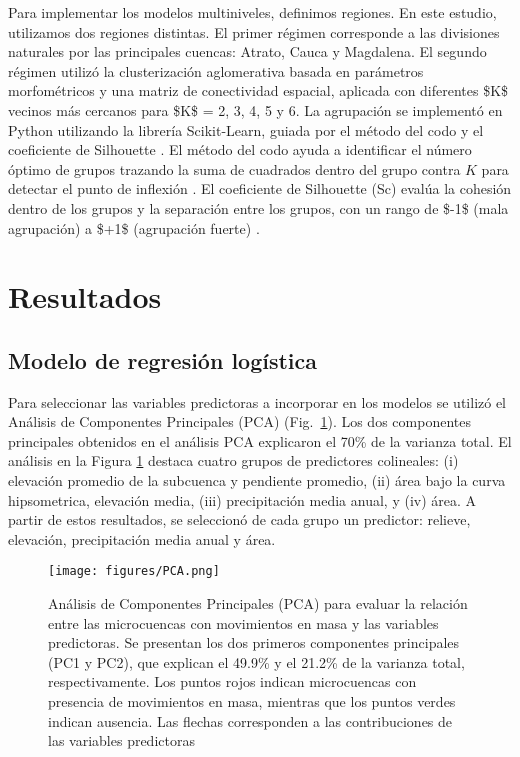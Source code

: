 \documentclass[
  manuscript=article,  
  layout=preprint,  
]{format}
\begin{document}
\par Para implementar los modelos multiniveles, definimos regiones. En este estudio, utilizamos dos regiones distintas. El primer régimen corresponde a las divisiones naturales por las principales cuencas: Atrato, Cauca y Magdalena. El segundo régimen utilizó la clusterización aglomerativa basada en parámetros morfométricos y una matriz de conectividad espacial, aplicada con diferentes \$K\$ vecinos más cercanos para \$K\$ = 2, 3, 4, 5 y 6. La agrupación se implementó en Python utilizando la librería Scikit-Learn, guiada por el método del codo y el coeficiente de Silhouette \cite{scikit-learn2011}. El método del codo ayuda a identificar el número óptimo de grupos trazando la suma de cuadrados dentro del grupo contra $K$ para detectar el punto de inflexión \cite{thorndike1953}. El coeficiente de Silhouette (Sc) evalúa la cohesión dentro de los grupos y la separación entre los grupos, con un rango de \$-1\$ (mala agrupación) a \$+1\$ (agrupación fuerte) \cite{rousseeuw1987}.

\section{Resultados}

\subsection{Modelo de regresión logística}

\par Para seleccionar las variables predictoras a incorporar en los modelos se utilizó el Análisis de Componentes Principales (PCA) (Fig.~\ref{fig:PCA}). Los dos componentes principales obtenidos en el análisis PCA explicaron el 70\% de la varianza total. El análisis en la Figura \ref{fig:PCA} destaca cuatro grupos de predictores colineales: (i) elevación promedio de la subcuenca y pendiente promedio, (ii) área bajo la curva hipsometrica, elevación media, (iii) precipitación media anual, y (iv) área. A partir de estos resultados, se seleccionó de cada grupo un predictor: relieve, elevación, precipitación media anual y área. 

\begin{figure}[ht!]
    \centering
      {\texttt{[image: figures/PCA.png]}}
\caption{Análisis de Componentes Principales (PCA) para evaluar la relación entre las microcuencas con movimientos en masa y las variables predictoras. Se presentan los dos primeros componentes principales (PC1 y PC2), que explican el 49.9\% y el 21.2\% de la varianza total, respectivamente. Los puntos rojos indican microcuencas con presencia de movimientos en masa, mientras que los puntos verdes indican ausencia. Las flechas corresponden a las contribuciones de las variables predictoras}
    \label{fig:PCA}
\end{figure}
\end{document}

